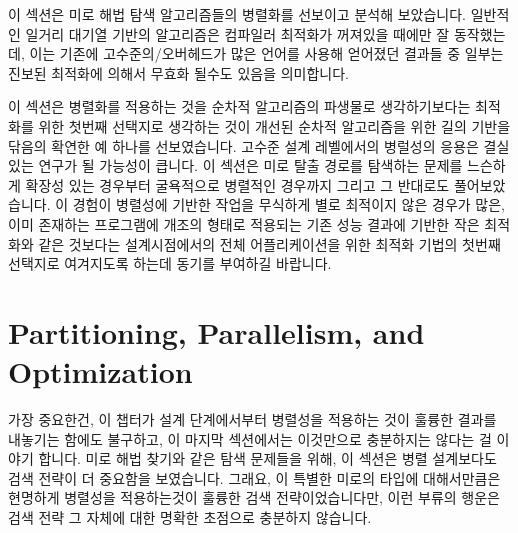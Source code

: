 이 섹션은 미로 해법 탐색 알고리즘들의 병렬화를 선보이고 분석해 보았습니다.
일반적인 일거리 대기열 기반의 알고리즘은 컴파일러 최적화가 꺼져있을 때에만 잘
동작했는데, 이는 기존에 고수준의/오버헤드가 많은 언어를 사용해 얻어졌던 결과들
중 일부는 진보된 최적화에 의해서 무효화 될수도 있음을 의미합니다.

이 섹션은 병렬화를 적용하는 것을 순차적 알고리즘의 파생물로 생각하기보다는
최적화를 위한 첫번째 선택지로 생각하는 것이 개선된 순차적 알고리즘을 위한 길의
기반을 닦음의 확연한 예 하나를 선보였습니다.
고수준 설계 레벨에서의 병럴성의 응용은 결실 있는 연구가 될 가능성이 큽니다.
이 섹션은 미로 탈출 경로를 탐색하는 문제를 느슨하게 확장성 있는 경우부터
굴욕적으로 병렬적인 경우까지 그리고 그 반대로도 풀어보았습니다.
이 경험이 병렬성에 기반한 작업을 무식하게 별로 최적이지 않은 경우가 많은, 이미
존재하는 프로그램에 개조의 형태로 적용되는 기존 성능 결과에 기반한 작은
최적화와 같은 것보다는 설계시점에서의 전체 어플리케이션을 위한 최적화 기법의
첫번째 선택지로 여겨지도록 하는데 동기를 부여하길 바랍니다.

\section{Partitioning, Parallelism, and Optimization}
\label{sec:SMPdesign:Partitioning, Parallelism, and Optimization}

가장 중요한건, 이 챕터가 설계 단계에서부터 병렬성을 적용하는 것이 훌륭한 결과를
내놓기는 함에도 불구하고, 이 마지막 섹션에서는 이것만으로 충분하지는 않다는 걸
이야기 합니다.
미로 해법 찾기와 같은 탐색 문제들을 위해, 이 섹션은 병렬 설계보다도 검색 전략이
더 중요함을 보였습니다.
그래요, 이 특별한 미로의 타입에 대해서만큼은 현명하게 병렬성을 적용하는것이
훌륭한 검색 전략이었습니다만, 이런 부류의 행운은 검색 전략 그 자체에 대한
명확한 초점으로 충분하지 않습니다.

